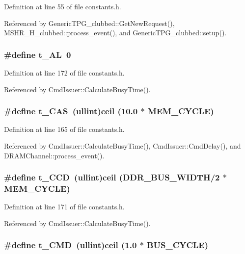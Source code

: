 Definition at line 55 of file constants.h.

Referenced by GenericTPG\_\-clubbed::GetNewRequest(), MSHR\_\-H\_\-clubbed::process\_\-event(), and GenericTPG\_\-clubbed::setup().
\subsubsection[{t\_\-AL}]{\setlength{\rightskip}{0pt plus 5cm}\#define t\_\-AL~0}\label{constants_8h_b1fecfcc74e0faf867dbe8fb5f87cbc5}




Definition at line 172 of file constants.h.

Referenced by CmdIssuer::CalculateBusyTime().
\subsubsection[{t\_\-CAS}]{\setlength{\rightskip}{0pt plus 5cm}\#define t\_\-CAS~({\bf ullint})ceil (10.0 $\ast$ MEM\_\-CYCLE)}\label{constants_8h_55e640defd9da0a9449fedac1ebf18dd}




Definition at line 165 of file constants.h.

Referenced by CmdIssuer::CalculateBusyTime(), CmdIssuer::CmdDelay(), and DRAMChannel::process\_\-event().
\subsubsection[{t\_\-CCD}]{\setlength{\rightskip}{0pt plus 5cm}\#define t\_\-CCD~({\bf ullint})ceil (DDR\_\-BUS\_\-WIDTH/2 $\ast$ MEM\_\-CYCLE)}\label{constants_8h_bc1e2abf1e234423a808c337c58ae1f2}




Definition at line 171 of file constants.h.

Referenced by CmdIssuer::CalculateBusyTime().
\subsubsection[{t\_\-CMD}]{\setlength{\rightskip}{0pt plus 5cm}\#define t\_\-CMD~({\bf ullint})ceil (1.0 $\ast$ BUS\_\-CYCLE)}\label{constants_8h_328952d73d403dc8f77007661c28061d}




